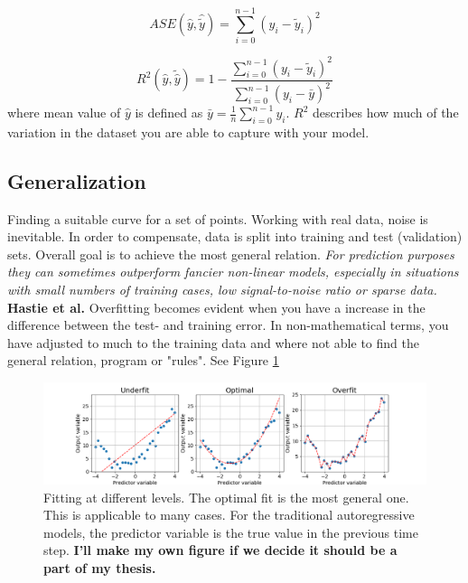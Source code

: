 \begin{equation} \label{eq:ase}
    ASE(\hat{y},\hat{\tilde{y}}) =  \sum_{i=0}^{n-1}(y_i-\tilde{y}_i)^2
\end{equation} 

\begin{equation} \label{eq:r2}
    R^2(\hat{y}, \tilde{\hat{y}}) = 1 - \frac{\sum_{i=0}^{n - 1} (y_i - \tilde{y}_i)^2}{\sum_{i=0}^{n - 1} (y_i - \bar{y})^2}
\end{equation} 
where mean value of $\hat{y}$ is defined as $\bar{y} =  \frac{1}{n} \sum_{i=0}^{n - 1} y_i$. $R^2$ describes how much of the variation in the dataset you are able to capture with your model.

\subsection{Generalization} \label{sec:generalization}
Finding a suitable curve for a set of points. Working with real data, noise is inevitable. In order to compensate, data is split into training and test (validation) sets. %
Overall goal is to achieve the most general relation. \textit{For prediction purposes they can sometimes outperform fancier non-linear models, especially in situations with small numbers of training cases, low signal-to-noise ratio or sparse data.} \textbf{Hastie et al.} Overfitting becomes evident when you have a increase in the difference between the test- and training error. In non-mathematical terms, you have adjusted to much to the training data and where not able to find the general relation, program or "rules". See Figure \ref{fig:linreg_overfitting} 

\begin{figure}[hp]
    \centering
    \includegraphics[scale = 0.5]{Chapter3_Method/figs/generalization.png}
    \caption{Fitting at different levels. The optimal fit is the most general one. This is applicable to many cases. For the traditional autoregressive models, the predictor variable is the true value in the previous time step. \textbf{I'll make my own figure if we decide it should be a part of my thesis.}}
    \label{fig:linreg_overfitting}
\end{figure}

